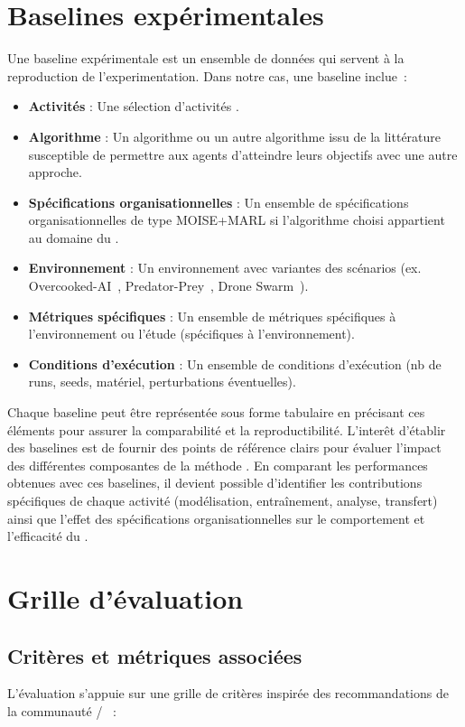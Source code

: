 \section{Baselines expérimentales}

Une baseline expérimentale est un ensemble de données qui servent à la reproduction de l'experimentation. Dans notre cas, une baseline inclue~:
\begin{itemize}
  \item \textbf{Activités} : Une sélection d'activités .
  \item \textbf{Algorithme} : Un algorithme  ou un autre algorithme issu de la littérature susceptible de permettre aux agents d'atteindre leurs objectifs avec une autre approche.
  \item \textbf{Spécifications organisationnelles} : Un ensemble de spécifications organisationnelles de type MOISE+MARL si l'algorithme choisi appartient au domaine du .
  \item \textbf{Environnement} : Un environnement avec variantes des scénarios (ex. Overcooked-AI~\cite{overcookedai}, Predator-Prey~\cite{lowe2017multi}, Drone Swarm~\cite{cage_challenge_3_announcement}).
  \item \textbf{Métriques spécifiques} : Un ensemble de métriques spécifiques à l'environnement ou l'étude (spécifiques à l'environnement).
  \item \textbf{Conditions d'exécution} : Un ensemble de conditions d'exécution (nb de runs, seeds, matériel, perturbations éventuelles).
\end{itemize}

Chaque baseline peut être représentée sous forme tabulaire en précisant ces éléments pour assurer la comparabilité et la reproductibilité. L'interêt d'établir des baselines est de fournir des points de référence clairs pour évaluer l'impact des différentes composantes de la méthode . En comparant les performances obtenues avec ces baselines, il devient possible d'identifier les contributions spécifiques de chaque activité (modélisation, entraînement, analyse, transfert) ainsi que l'effet des spécifications organisationnelles sur le comportement et l'efficacité du .

\section{Grille d'évaluation}\label{sec:evaluation_grid}

\subsection{Critères et métriques associées}\label{sec:criteria_metrics}
L'évaluation s'appuie sur une grille de critères inspirée des recommandations de la communauté /~\cite{papoudakis2021agent} :

